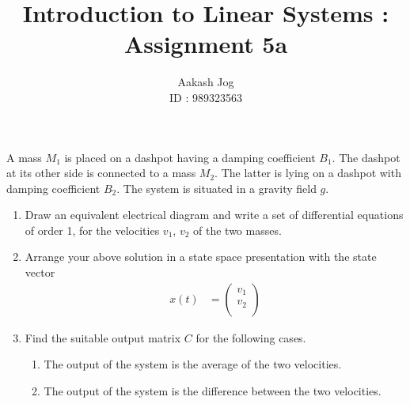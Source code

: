 \documentclass[fleqn, a4paper, 11pt, oneside]{amsart}
\title{Introduction to Linear Systems : Assignment 5a}
\author
{
	Aakash Jog\\
	ID : 989323563
}
\date{\formatdate{19}{11}{2015}}
\theoremstyle{definition}
\theoremstyle{theorem}
\begin{document}

\maketitle

\begin{question}
	A mass $M_1$ is placed on a dashpot having a damping coefficient $B_1$.
	The dashpot at its other side is connected to a mass $M_2$.
	The latter is lying on a dashpot with damping coefficient $B_2$.
	The system is situated in a gravity field $g$.
	\begin{enumerate}
		\item
			Draw an equivalent electrical diagram and write a set of differential equations of order 1, for the velocities $v_1$, $v_2$ of the two masses.
		\item
			Arrange your above solution in a state space presentation with the state vector
			\begin{align*}
				x(t) &=
					\begin{pmatrix}
						v_1 \\
						v_2 \\
					\end{pmatrix}
			\end{align*}
		\item
			Find the suitable output matrix $C$ for the following cases.
			\begin{enumerate}
				\item The output of the system is the average of the two velocities.
				\item The output of the system is the difference between the two velocities.
			\end{enumerate}
	\end{enumerate}
\end{question}
\end{document}
